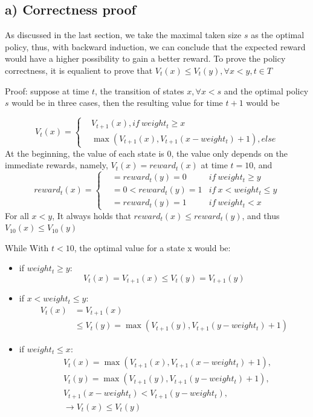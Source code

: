 \subsection{a) Correctness proof}
\label{sec:1.a}
As discussed in the last section, we take the maximal taken size $s$ as the optimal policy, thus, with backward induction, we can conclude that the expected reward would have a higher possibility to gain a better reward. To prove the policy correctness, it is equalient to prove that $V_t(x) \leq V_t(y), \forall x < y,t\in T$

Proof:
suppose at time $t$, the transition of states $x,\forall x < s$ and the optimal policy $s$ would be in three cases, then the resulting value for time $t+1$ would be

\begin{equation}
    V_{t}(x) = \left\{
    \begin{aligned}
    &V_{t+1}(x), if\ weight_t \ge x \\
    &\max (V_{t+1}(x), V_{t+1}(x-weight_t) + 1), else
\end{aligned}
\right.
\end{equation}
At the beginning, the value of each state is 0, the value only depends on the immediate rewards, namely, $V_t(x)=reward_t(x)$ at time $t=10$, and 
\begin{equation}
    reward_{t}(x) = \left\{
    \begin{aligned}
    & = reward_{t}(y) = 0 &if\ weight_t \ge y \\
    & = 0 < reward_t(y) = 1& if\ x < weight_t \leq y\\
    & = reward_t(y) = 1 & if\ weight_t < x
\end{aligned}
\right.
\end{equation}
For all $x<y$, It always holds that $reward_{t}(x)\leq reward_{t}(y)$, and thus $V_{10}(x) \leq V_{10}(y)$
 
While With $t<10$, the optimal value for a state x would be:
\begin{itemize}
    \item if $weight_t \ge y$:\\
    $$V_t(x) = V_{t+1}(x) \leq V_{t}(y) = V_{t+1}(y)$$
    \item if $x < weight_t \leq y$:\\
    $$\begin{aligned} V_t(x) &=V_{t+1}(x)\\ &\leq V_{t}(y) = \max(V_{t+1}(y), V_{t+1}(y-weight_t)+1)\end{aligned}$$
    \item if $weight_t \leq x$:\\
    $$\begin{aligned} & V_t(x) = \max(V_{t+1}(x), V_{t+1}(x-weight_t)+1),\\
    & V_{t}(y) = \max(V_{t+1}(y), V_{t+1}(y-weight_t)+1),\\
    & V_{t+1}(x-weight_t)<V_{t+1}(y-weight_t),\\
    & \rightarrow V_t(x) \leq V_t(y)
    \end{aligned} $$
\end{itemize}
 
